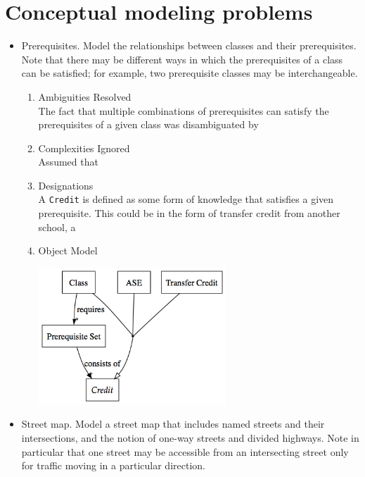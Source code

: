 \documentclass[11pt,letterpaper]{article}
\begin{document}
\section{Conceptual modeling problems}
\begin{itemize}
\item Prerequisites. Model the relationships between classes and their prerequisites. Note that there may be different ways in which the prerequisites of a class can be satisfied; for example, two prerequisite classes may be interchangeable.\\

\begin{enumerate}
\item Ambiguities Resolved\\
The fact that multiple combinations of prerequisites can satisfy the prerequisites of a given class was disambiguated by 

\item Complexities Ignored\\
Assumed that

\item Designations\\
A \texttt{Credit} is defined as some form of knowledge that satisfies a given prerequisite. This could be in the form of transfer credit from another school, a


\item Object Model\\
\begin{center}
\includegraphics[width=200pt]{dot/b1.png}
\label{fig:ob1} 
\end{center}
\end{enumerate}

\item Street map. Model a street map that includes named streets and their intersections, and the notion of one-way streets and divided highways. Note in particular that one street may be accessible from an intersecting street only for traffic moving in a particular direction.


\end{itemize}
\end{document}
